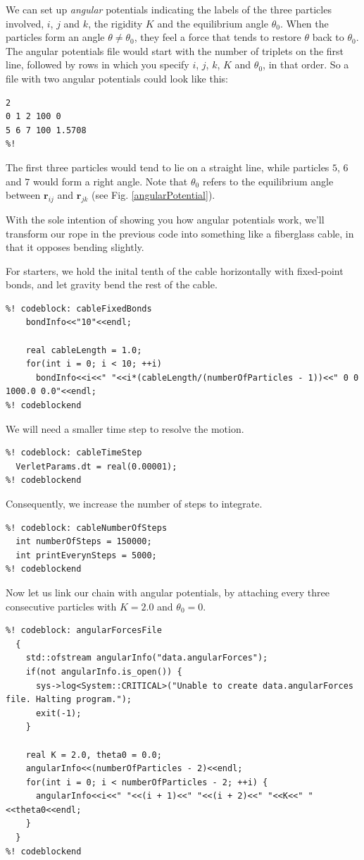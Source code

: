 We can set up \textit{angular} potentials indicating the labels of the three 
particles involved, $i$, $j$ and $k$, the rigidity $K$ and the equilibrium angle 
$\theta_0$. When the particles form an angle $\theta \neq \theta_0$, they feel a 
force that tends to restore $\theta$ back to $\theta_0$. The angular potentials 
file would start with the number of triplets on the first line, followed by rows 
in which you specify $i$, $j$, $k$, $K$ and $\theta_0$, in that order. So a file 
with two angular potentials could look like this:
\begin{lstlisting}
2
0 1 2 100 0
5 6 7 100 1.5708
%!
\end{lstlisting}
The first three particles would tend to lie on a straight line, while particles 
$5$, $6$ and $7$ would form a right angle. Note that $\theta_0$ refers to the 
equilibrium angle between $\mathbf{r}_{ij}$ and $\mathbf{r}_{jk}$ (see Fig. 
\ref{angularPotential}).

With the sole intention of showing you how angular potentials work, we'll 
transform our rope in the previous code into something like a fiberglass cable, 
in that it opposes bending slightly.

For starters, we hold the inital tenth of the cable horizontally with
fixed-point bonds, and let gravity bend the rest of the cable.
\begin{lstlisting}
%! codeblock: cableFixedBonds
    bondInfo<<"10"<<endl;

    real cableLength = 1.0;
    for(int i = 0; i < 10; ++i)
      bondInfo<<i<<" "<<i*(cableLength/(numberOfParticles - 1))<<" 0 0 1000.0 0.0"<<endl;
%! codeblockend
\end{lstlisting}
We will need a smaller time step to resolve the motion.
\begin{lstlisting}
%! codeblock: cableTimeStep
  VerletParams.dt = real(0.00001);
%! codeblockend
\end{lstlisting}
Consequently, we increase the number of steps to integrate.
\begin{lstlisting}
%! codeblock: cableNumberOfSteps
  int numberOfSteps = 150000;
  int printEverynSteps = 5000;
%! codeblockend
\end{lstlisting}

Now let us link our chain with angular potentials, by attaching every three
consecutive particles with $K = 2.0$ and $\theta_0 = 0$.
\begin{lstlisting}
%! codeblock: angularForcesFile
  {
    std::ofstream angularInfo("data.angularForces");
    if(not angularInfo.is_open()) {
      sys->log<System::CRITICAL>("Unable to create data.angularForces file. Halting program.");
      exit(-1);
    }

    real K = 2.0, theta0 = 0.0;
    angularInfo<<(numberOfParticles - 2)<<endl;
    for(int i = 0; i < numberOfParticles - 2; ++i) {
      angularInfo<<i<<" "<<(i + 1)<<" "<<(i + 2)<<" "<<K<<" "<<theta0<<endl;
    }
  }
%! codeblockend
\end{lstlisting}

